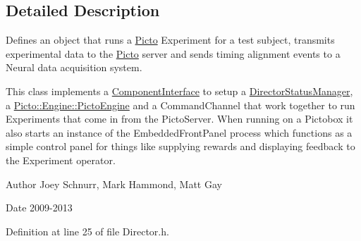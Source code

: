 \subsection{Detailed Description}
Defines an object that runs a \hyperlink{namespace_picto}{Picto} Experiment for a test subject, transmits experimental data to the \hyperlink{namespace_picto}{Picto} server and sends timing alignment events to a Neural data acquisition system. 

This class implements a \hyperlink{class_component_interface}{Component\-Interface} to setup a \hyperlink{class_director_status_manager}{Director\-Status\-Manager}, a \hyperlink{class_picto_1_1_engine_1_1_picto_engine}{Picto\-::\-Engine\-::\-Picto\-Engine} and a Command\-Channel that work together to run Experiments that come in from the Picto\-Server. When running on a Pictobox it also starts an instance of the Embedded\-Front\-Panel process which functions as a simple control panel for things like supplying rewards and displaying feedback to the Experiment operator. \begin{DoxyAuthor}{Author}
Joey Schnurr, Mark Hammond, Matt Gay 
\end{DoxyAuthor}
\begin{DoxyDate}{Date}
2009-\/2013 
\end{DoxyDate}


Definition at line 25 of file Director.\-h.



